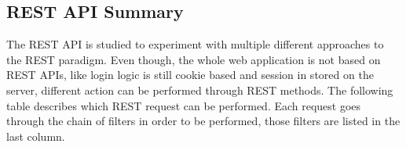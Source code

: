 \subsection{REST API Summary}

The REST API is studied to experiment with multiple different approaches to the REST paradigm. 
Even though, the whole web application is not based on REST APIs, like login logic is still cookie based and session in stored on the server, different action can be performed through REST methods. 
The following table describes which REST request can be performed. Each request goes through the chain of filters in order to be performed, those filters are listed in the last column.


